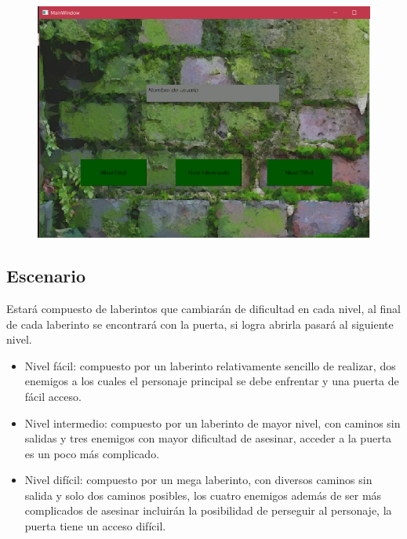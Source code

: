 \documentclass{article}
\begin{document}
\begin{figure}[h!]
    \centering
    \includegraphics[scale=0.6]{muestra.png}
\end{figure}
 
\newpage

\subsection{Escenario}
Estará compuesto de laberintos que cambiarán de dificultad en cada nivel, al final de cada laberinto se encontrará con la puerta, si logra abrirla pasará al siguiente nivel.

\begin{itemize}
\item Nivel fácil: compuesto por un laberinto relativamente sencillo de realizar, dos enemigos a los cuales el personaje principal se debe enfrentar y una puerta de fácil acceso.
\item Nivel intermedio: compuesto por un laberinto de mayor nivel, con caminos sin salidas y tres enemigos con mayor dificultad de asesinar, acceder a la puerta es un poco más complicado.
\item Nivel difícil: compuesto por un mega laberinto, con diversos caminos sin salida y solo dos caminos posibles, los cuatro enemigos además de ser más complicados de asesinar incluirán la posibilidad de perseguir al personaje, la puerta tiene un acceso difícil. 
\end{itemize}
\end{document}
